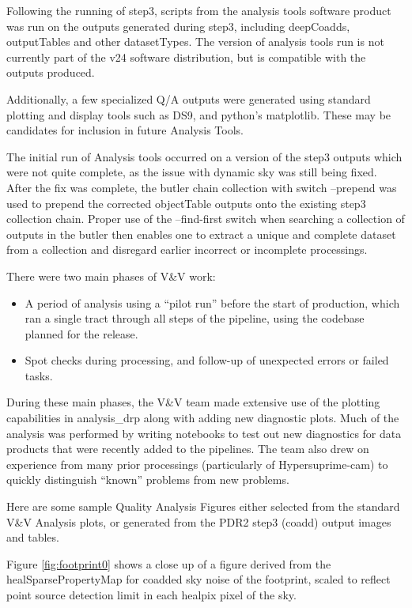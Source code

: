 Following the running of step3, scripts from the analysis tools software product
was run on the outputs generated during step3, including deepCoadds, outputTables and other
datasetTypes. The version of analysis tools run is not currently part of the v24 software distribution,
but is compatible with the outputs produced.

Additionally, a few specialized Q/A outputs were generated using standard plotting and display
tools such as DS9, and python's matplotlib.  These may be candidates for inclusion in future 
Analysis Tools.

The initial run of Analysis tools occurred on a version of the step3 outputs which were not
quite complete, as the issue with dynamic sky was still being fixed.  
After the fix was complete,  the butler chain collection with switch --prepend was used to
prepend the corrected objectTable outputs onto the existing step3 collection chain.
Proper use of the --find-first switch when searching a collection of outputs in the butler then
enables one to extract a unique and complete dataset from a collection and disregard earlier incorrect or 
incomplete processings.

There were two main phases of V\&V work:

\begin{itemize}
\item A period of analysis using a “pilot run” before the start of production, which ran a single
tract through all steps of the pipeline, using the codebase planned for the release.
\item Spot checks during processing, and follow-up of unexpected errors or failed tasks.
\end{itemize}

During these main phases, the V\&V team made extensive use of the plotting capabilities in
analysis\_drp along with adding new diagnostic plots. Much of the analysis was performed by writing
notebooks to test out new diagnostics for data products that were recently added to the pipelines.
The team also drew on experience from many prior processings (particularly of Hypersuprime-cam) to
quickly distinguish ``known'' problems from new problems.

Here are some sample Quality Analysis Figures either selected from the 
standard V\&V Analysis plots, or generated from the PDR2 step3 (coadd) 
output images and tables.

Figure \ref{fig:footprint0} shows a close up of a figure derived from the healSparsePropertyMap for 
coadded sky noise of the footprint, scaled to reflect point source detection limit in each 
healpix pixel of the sky.

